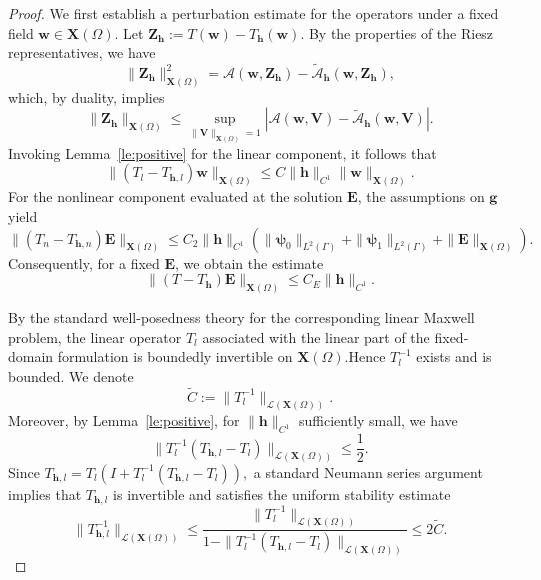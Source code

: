 \documentclass[12pt,reqno]{amsart}
\theoremstyle{definition}
\numberwithin{equation}{section}
\begin{document}
\begin{proof}
We first establish a perturbation estimate for the operators under a fixed field $\mathbf{w} \in \mathbf{X}(\Omega)$. Let $\mathbf{Z}_{\mathbf{h}} := T(\mathbf{w}) - T_{\mathbf{h}}(\mathbf{w})$. By the properties of the Riesz representatives, we have
\[
\|\mathbf{Z}_{\mathbf{h}}\|_{\mathbf{X}(\Omega)}^2 = \mathcal{A}(\mathbf{w}, \mathbf{Z}_{\mathbf{h}}) - \widetilde{\mathcal{A}}_{\mathbf{h}}(\mathbf{w}, \mathbf{Z}_{\mathbf{h}}),
\]
which, by duality, implies
\[
\|\mathbf{Z}_{\mathbf{h}}\|_{\mathbf{X}(\Omega)} \le \sup_{\|\mathbf{V}\|_{\mathbf{X}(\Omega)}=1} \left| \mathcal{A}(\mathbf{w}, \mathbf{V}) - \widetilde{\mathcal{A}}_{\mathbf{h}}(\mathbf{w}, \mathbf{V}) \right|.
\]
Invoking Lemma~\ref{le:positive} for the linear component, it follows that
\[
\|(T_l - T_{\mathbf{h},l})\mathbf{w}\|_{\mathbf{X}(\Omega)} \le C \|\mathbf{h}\|_{C^1} \|\mathbf{w}\|_{\mathbf{X}(\Omega)}.
\]
For the nonlinear component evaluated at the solution $\mathbf{E}$, the assumptions on $\mathbf{g}$ yield
\[
\|(T_n - T_{\mathbf{h},n})\mathbf{E}\|_{\mathbf{X}(\Omega)} \le C_2 \|\mathbf{h}\|_{C^1} \left( \|\boldsymbol{\psi}_0\|_{L^2(\Gamma)} + \|\boldsymbol{\psi}_1\|_{L^2(\Gamma)} + \|\mathbf{E}\|_{\mathbf{X}(\Omega)} \right).
\]
Consequently, for a fixed $\mathbf{E}$, we obtain the estimate
\begin{equation}
\label{eq:operator_perturbation_impedance}
\|(T - T_{\mathbf{h}})\mathbf{E}\|_{\mathbf{X}(\Omega)} \le C_E \|\mathbf{h}\|_{C^1}.
\end{equation}

By the standard well-posedness theory for the corresponding linear Maxwell
problem, the linear operator \(T_l\) associated with the linear part of the
fixed-domain formulation is boundedly invertible on \(\mathbf X(\Omega)\).Hence \(T_l^{-1}\) exists and is bounded. We denote
\[
\widetilde C:=\|T_l^{-1}\|_{\mathcal L(\mathbf X(\Omega))}.
\]
Moreover, by Lemma~\ref{le:positive}, for
\(\|\mathbf h\|_{C^1}\) sufficiently small, we have
\[
\|T_l^{-1}(T_{\mathbf h,l}-T_l)\|_{\mathcal L(\mathbf X(\Omega))}\le
\frac12 .
\]
Since
$T_{\mathbf h,l}=T_l\left(I+T_l^{-1}(T_{\mathbf h,l}-T_l)
\right),$
a standard Neumann series argument implies that \(T_{\mathbf h,l}\) is
invertible and satisfies the uniform stability estimate
\[
\|T_{\mathbf h,l}^{-1}\|_{\mathcal L(\mathbf X(\Omega))}
\le\frac{\|T_l^{-1}\|_{\mathcal L(\mathbf X(\Omega))}
}{1-\|T_l^{-1}(T_{\mathbf h,l}-T_l)\|_{\mathcal L(\mathbf X(\Omega))}
}\le2\widetilde C .\]


\end{proof}
\end{document}

